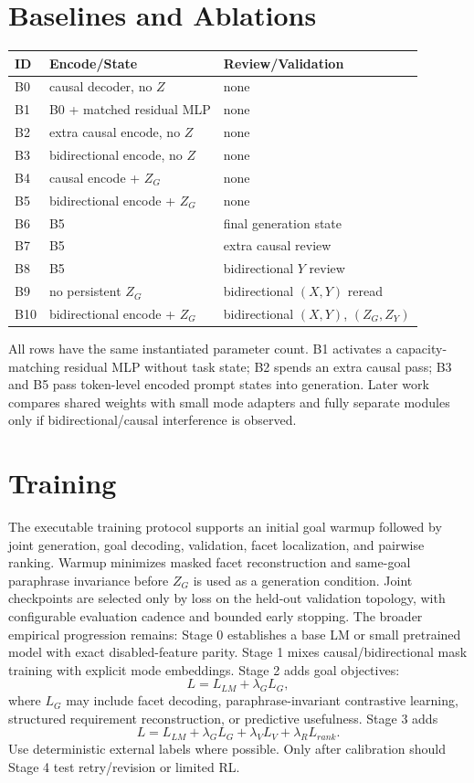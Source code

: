 \documentclass[11pt]{article}
\begin{document}
\section{Baselines and Ablations}
\begin{center}\begin{tabular}{lll}\toprule
ID & Encode/State & Review/Validation\\\midrule
B0 & causal decoder, no $Z$ & none\\
B1 & B0 + matched residual MLP & none\\
B2 & extra causal encode, no $Z$ & none\\
B3 & bidirectional encode, no $Z$ & none\\
B4 & causal encode + $Z_G$ & none\\
B5 & bidirectional encode + $Z_G$ & none\\
B6 & B5 & final generation state\\
B7 & B5 & extra causal review\\
B8 & B5 & bidirectional $Y$ review\\
B9 & no persistent $Z_G$ & bidirectional $(X,Y)$ reread\\
B10 & bidirectional encode + $Z_G$ & bidirectional $(X,Y)$, $(Z_G,Z_Y)$\\
\bottomrule\end{tabular}\end{center}
All rows have the same instantiated parameter count. B1 activates a capacity-matching residual MLP without task state; B2 spends an extra causal pass; B3 and B5 pass token-level encoded prompt states into generation. Later work compares shared weights with small mode adapters and fully separate modules only if bidirectional/causal interference is observed.

\section{Training}
The executable training protocol supports an initial goal warmup followed by joint generation, goal decoding, validation, facet localization, and pairwise ranking. Warmup minimizes masked facet reconstruction and same-goal paraphrase invariance before $Z_G$ is used as a generation condition. Joint checkpoints are selected only by loss on the held-out validation topology, with configurable evaluation cadence and bounded early stopping. The broader empirical progression remains: Stage 0 establishes a base LM or small pretrained model with exact disabled-feature parity. Stage 1 mixes causal/bidirectional mask training with explicit mode embeddings. Stage 2 adds goal objectives:
\begin{equation}
L=L_{LM}+\lambda_G L_G,
\end{equation}
where $L_G$ may include facet decoding, paraphrase-invariant contrastive learning, structured requirement reconstruction, or predictive usefulness. Stage 3 adds
\begin{equation}
L=L_{LM}+\lambda_G L_G+\lambda_V L_V+\lambda_R L_{rank}.
\end{equation}
Use deterministic external labels where possible. Only after calibration should Stage 4 test retry/revision or limited RL.
\end{document}
